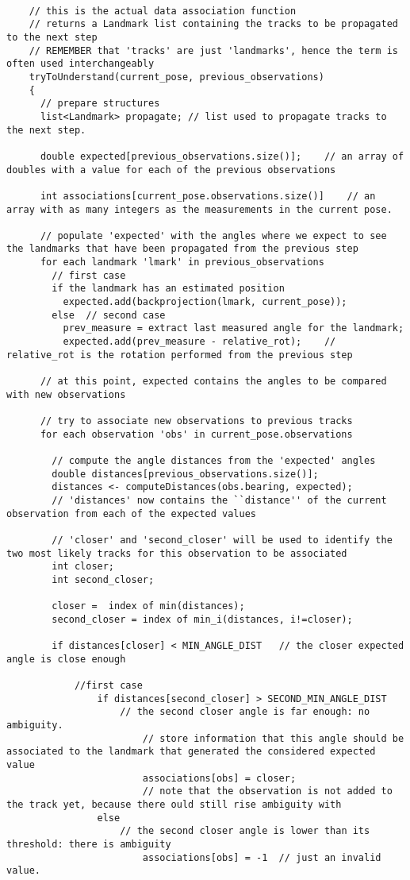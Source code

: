 {\begin{lstlisting}[frame=shadowbox,breaklines]
    
    // this is the actual data association function
    // returns a Landmark list containing the tracks to be propagated to the next step
    // REMEMBER that 'tracks' are just 'landmarks', hence the term is often used interchangeably
    tryToUnderstand(current_pose, previous_observations)
    {
      // prepare structures
      list<Landmark> propagate;	// list used to propagate tracks to the next step.
      
      double expected[previous_observations.size()];	// an array of doubles with a value for each of the previous observations
      
      int associations[current_pose.observations.size()]	// an array with as many integers as the measurements in the current pose.
      
      // populate 'expected' with the angles where we expect to see the landmarks that have been propagated from the previous step
      for each landmark 'lmark' in previous_observations
      	// first case
      	if the landmark has an estimated position
          expected.add(backprojection(lmark, current_pose));
        else  // second case
          prev_measure = extract last measured angle for the landmark;
          expected.add(prev_measure - relative_rot);	// relative_rot is the rotation performed from the previous step
      
      // at this point, expected contains the angles to be compared with new observations
      
      // try to associate new observations to previous tracks
      for each observation 'obs' in current_pose.observations
        
        // compute the angle distances from the 'expected' angles 
        double distances[previous_observations.size()];
        distances <- computeDistances(obs.bearing, expected);
        // 'distances' now contains the ``distance'' of the current observation from each of the expected values
        
        // 'closer' and 'second_closer' will be used to identify the two most likely tracks for this observation to be associated
        int closer;
        int second_closer;
        
        closer =  index of min(distances);
        second_closer = index of min_i(distances, i!=closer);
        
        if distances[closer] < MIN_ANGLE_DIST	// the closer expected angle is close enough
        	
        	//first case
                if distances[second_closer] > SECOND_MIN_ANGLE_DIST
                	// the second closer angle is far enough: no ambiguity.
                        // store information that this angle should be associated to the landmark that generated the considered expected value
                        associations[obs] = closer;
                        // note that the observation is not added to the track yet, because there ould still rise ambiguity with 
                else
                	// the second closer angle is lower than its threshold: there is ambiguity
                        associations[obs] = -1	// just an invalid value.
                        

\end{lstlisting}}
